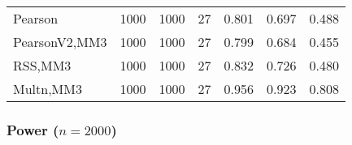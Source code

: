 \documentclass[
]{article}
\begin{document}
\begin{table}[H]
{\begin{tabular}[t]{lrrrrrr}
\hspace{1em}Pearson & 1000 & 1000 & 27 & 0.801 & 0.697 & 0.488\\
\hspace{1em}PearsonV2,MM3 & 1000 & 1000 & 27 & 0.799 & 0.684 & 0.455\\
\hspace{1em}RSS,MM3 & 1000 & 1000 & 27 & 0.832 & 0.726 & 0.480\\
\hspace{1em}Multn,MM3 & 1000 & 1000 & 27 & 0.956 & 0.923 & 0.808\\
\bottomrule
\end{tabular}}
\end{table}

\hypertarget{power-n2000-1}{%
\subsubsection{\texorpdfstring{Power
(\(n=2000\))}{Power (n=2000)}}\label{power-n2000-1}}
\end{document}
